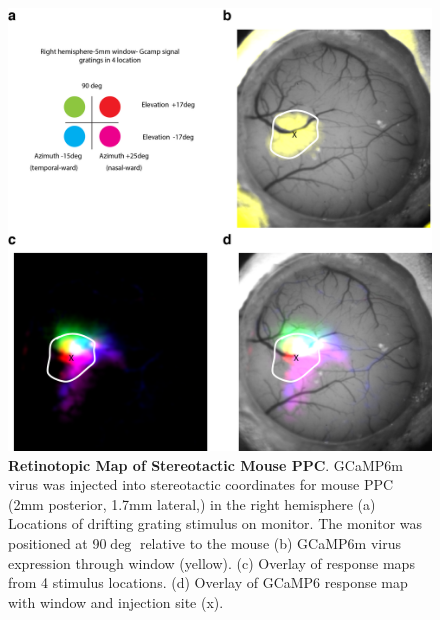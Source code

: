 \begin{figure}
  \centering
   \includegraphics[width=\textwidth]{Figures/chapter4/kppc1_harvey_ppc_injections.png}
  \caption[Retinotopic Map of Stereotactic Mouse PPC]{\textbf{Retinotopic Map of Stereotactic Mouse PPC}. GCaMP6m virus was injected into stereotactic coordinates for mouse PPC (2mm posterior, 1.7mm lateral,\parencite{Harvey2012}) in the right hemisphere (a) Locations of drifting grating stimulus on monitor. The monitor was positioned at 90$\deg$ relative to the mouse (b) GCaMP6m virus expression through window (yellow). (c) Overlay of response maps from 4 stimulus locations. (d) Overlay of GCaMP6 response map with window and injection site (x).}
   \label{fig:ppcgcamp}
\end{figure}


